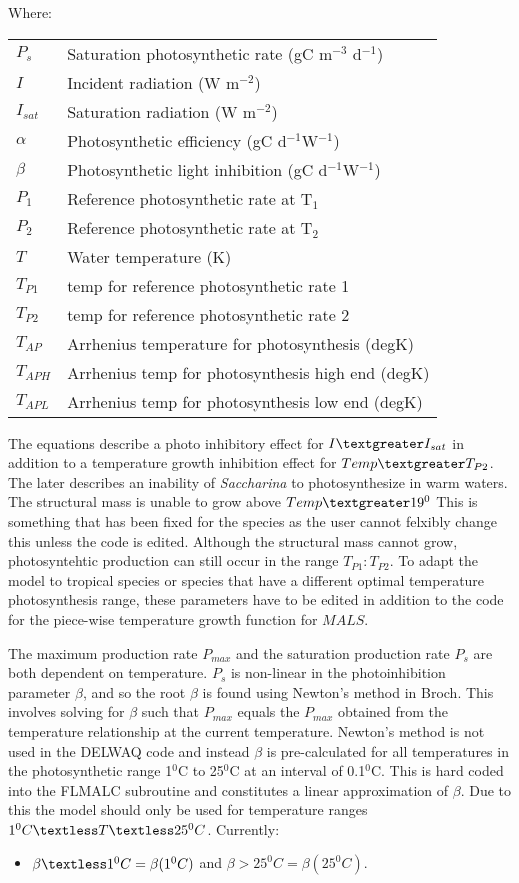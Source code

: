 \documentclass{deltares_manual}
\begin{document}
Where:\\
\begin{tabular}{ll}
$P_s$ & Saturation photosynthetic rate (gC m$^{-3}$ d$^{-1}$)\\
$I$ & Incident radiation (W m$^{-2}$)\\
$I_{sat}$ & Saturation radiation (W m$^{-2}$)\\
$\alpha$ & Photosynthetic efficiency (gC d$^{-1}$W$^{-1}$) \\
$\beta$ & Photosynthetic light inhibition (gC d$^{-1}$W$^{-1}$) \\
$P_1$ & Reference photosynthetic rate at T$_1$\\
$P_2$ & Reference photosynthetic rate at T$_2$\\
$T$ & Water temperature (K)\\
$T_{P1}$ & temp for reference photosynthetic rate 1\\
$T_{P2}$ & temp for reference photosynthetic rate 2	\\
$T_{AP}$ & Arrhenius temperature for photosynthesis               (degK)\\
$T_{APH}$ & Arrhenius temp for photosynthesis high end             (degK)\\
$T_{APL}$ & Arrhenius temp for photosynthesis low end             (degK)\\
\end{tabular}

The equations describe a photo inhibitory effect for $I\textgreater I_{sat}$ in addition to a temperature growth inhibition effect for $Temp \textgreater T_{P2}$. The later describes an inability of \textit{Saccharina} to photosynthesize in warm waters. The structural mass is unable to grow above $Temp \textgreater 19^{0}$ This is something that has been fixed for the species as the user cannot felxibly change this unless the code is edited. Although the structural mass cannot grow, photosyntehtic production can still occur in the range $T_{P1}:T_{P2}$. To adapt the model to tropical species or species that have a different optimal temperature photosynthesis range, these parameters have to be edited in addition to the code for the piece-wise temperature growth function for $MALS$.

The maximum production rate $P_{max}$ and the saturation production rate $P_{s}$ are both dependent on temperature. $P_{s}$ is non-linear in the photoinhibition parameter $\beta$, and so the root $\beta$ is found using Newton's method in Broch. This involves solving for $\beta$ such that $P_{max}$ equals the $P_{max}$ obtained from the temperature relationship at the current temperature. Newton's method is not used in the DELWAQ code and instead $\beta$ is pre-calculated for all temperatures in the photosynthetic range 1$^{0}$C to 25$^{0}$C at an interval of 0.1$^{0}$C. This is hard coded into the FLMALC subroutine and constitutes a linear approximation of $\beta$. Due to this the model should only be used for temperature ranges $1^{0}C \textless T \textless 25^{0}C$. Currently:
\begin{itemize}
	\item $\beta \textless 1 ^{0}C = \beta(1 ^{0}C)$ and $\beta > 25 ^{0}C = \beta(25 ^{0}C)$. 
\end{itemize} 
\end{document}

